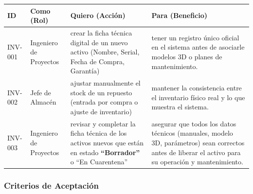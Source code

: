 \documentclass[12pt, a4paper]{article}
\begin{document}
\begin{longtable}{|p{2cm}|p{3.5cm}|p{5cm}|p{4.5cm}|}
\hline
\textbf{ID} & \textbf{Como (Rol)} & \textbf{Quiero (Acción)} & \textbf{Para (Beneficio)} \\ \hline
INV-001 & Ingeniero de Proyectos & crear la ficha técnica digital de un nuevo activo (Nombre, Serial, Fecha de Compra, Garantía) & tener un registro único oficial en el sistema antes de asociarle modelos 3D o planes de mantenimiento. \\ \hline
INV-002 & Jefe de Almacén & ajustar manualmente el stock de un repuesto (entrada por compra o ajuste de inventario) & mantener la consistencia entre el inventario físico real y lo que muestra el sistema. \\ \hline
INV-003 & Ingeniero de Proyectos & revisar y completar la ficha técnica de los activos nuevos que están en estado \textbf{``Borrador''} o ``En Cuarentena'' & asegurar que todos los datos técnicos (manuales, modelo 3D, parámetros) sean correctos antes de liberar el activo para su operación y mantenimiento. \\ \hline
\end{longtable}

\subsubsection*{Criterios de Aceptación}
\end{document}

